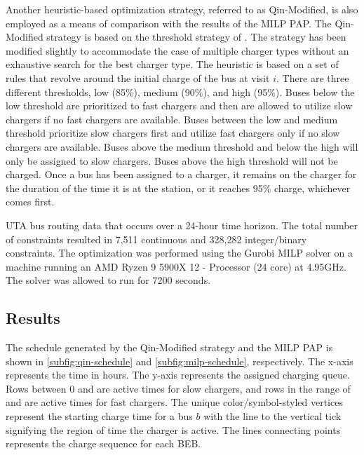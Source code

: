 \documentclass[utf8]{FrontiersinHarvard}
\let\cite\citep                                       %
\newcommand{\fast}{15 }                                                         %
\newcommand{\slow}{15 }                                                         %
\newcommand{\contvars}{7,511 }
\newcommand{\intvars}{328,282 }
\newcommand{\timeran}{7200 }                                                    %
\begin{document}
Another heuristic-based optimization strategy, referred to as Qin-Modified, is also employed as a means of comparison
with the results of the MILP PAP. The Qin-Modified strategy is based on the threshold strategy of
\cite{qin-2016-numer-analy}. The strategy has been modified slightly to accommodate the case of multiple charger types
without an exhaustive search for the best charger type. The heuristic is based on a set of rules that revolve around the
initial charge of the bus at visit \(i\). There are three different thresholds, low (85\%), medium (90\%), and high (95\%).
Buses below the low threshold are prioritized to fast chargers and then are allowed to utilize slow chargers if no fast
chargers are available. Buses between the low and medium threshold prioritize slow chargers first and utilize fast
chargers only if no slow chargers are available. Buses above the medium threshold and below the high will only be
assigned to slow chargers. Buses above the high threshold will not be charged. Once a bus has been assigned to a
charger, it remains on the charger for the duration of the time it is at the station, or it reaches 95\% charge,
whichever comes first.

UTA bus routing data that occurs over a 24-hour time horizon. The total number of constraints resulted in \contvars
continuous and \intvars integer/binary constraints. The optimization was performed using the Gurobi MILP solver
\cite{gurobi-2021-gurob-optim} on a machine running an AMD Ryzen 9 5900X 12 - Processor (24 core) at 4.95GHz. The
solver was allowed to run for \timeran seconds.

\subsection{Results}
\label{results}
The schedule generated by the Qin-Modified strategy and the MILP PAP is shown in \autoref{subfig:qin-schedule} and
\autoref{subfig:milp-schedule}, respectively. The x-axis represents the time in hours. The y-axis represents the
assigned charging queue. Rows between 0 and \fpeval{\slow - 1} are active times for slow chargers, and rows in the range
of \fpeval{\slow - 1} and \fpeval{\fast + \slow - 1} are active times for fast chargers. The unique color/symbol-styled
vertices represent the starting charge time for a bus \(b\) with the line to the vertical tick signifying the region of
time the charger is active. The lines connecting points represents the charge sequence for each BEB.
\end{document}
